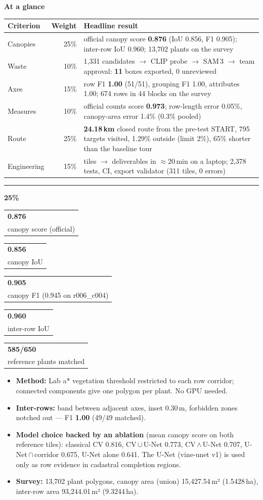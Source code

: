 \documentclass[10pt,a4paper]{article}
\makeatletter
\newcommand{\crit}[3]{%
  \par\vspace{7pt}%
  {\color{#1}\rule[-2pt]{6pt}{12pt}}\hspace{5pt}{\large\bfseries\color{night}#2}\hfill{\bfseries\color{#1}#3}\par
  \vspace{-2pt}{\color{#1}\rule{\linewidth}{0.8pt}}\par\vspace{2pt}}
\newcommand{\kpi}[2]{\begin{tabular}[t]{@{}l@{}}{\Large\bfseries\color{night}#1}\\[-1pt]{\scriptsize\color{muted}#2}\end{tabular}}
\makeatother
\begin{document}
\vspace{4pt}
{\large\bfseries At a glance}\par\vspace{2pt}
{\small
\begin{tabularx}{\linewidth}{@{}l r Y@{}}
  \toprule
  \textbf{Criterion} & \textbf{Weight} & \textbf{Headline result} \\
  \midrule
  Canopies    & 25\% & official canopy score \textbf{0.876} (IoU 0.856, F1 0.905); inter-row IoU 0.960; 13,702 plants on the survey \\
  Waste       & 10\% & 1,331 candidates $\rightarrow$ CLIP probe $\rightarrow$ SAM\,3 $\rightarrow$ team approval: \textbf{11} boxes exported, 0 unreviewed \\
  Axes        & 15\% & row F1 \textbf{1.00} (51/51), grouping F1 1.00, attributes 1.00; 674 rows in 44 blocks on the survey \\
  Measures    & 10\% & official counts score \textbf{0.973}; row-length error 0.05\%, canopy-area error 1.4\% (0.3\% pooled) \\
  Route       & 25\% & \textbf{24.18\,km} closed route from the pre-test START, 795 targets visited, 1.29\% outside (limit 2\%), 65\% shorter than the baseline tour \\
  Engineering & 15\% & tiles $\rightarrow$ deliverables in $\approx$20\,min on a laptop; 2,378 tests, CI, export validator (311 tiles, 0 errors) \\
  \bottomrule
\end{tabularx}}

\crit{cCan}{Canopies}{25\%}
\kpi{0.876}{canopy score (official)}\hfill
\kpi{0.856}{canopy IoU}\hfill
\kpi{0.905}{canopy F1 (0.945 on r006\_c004)}\hfill
\kpi{0.960}{inter-row IoU}\hfill
\kpi{585/650}{reference plants matched}
\par\vspace{3pt}
{\small
\begin{itemize}
  \item \textbf{Method:} Lab a* vegetation threshold restricted to each row corridor; connected components give one polygon per plant. No GPU needed.
  \item \textbf{Inter-rows:} band between adjacent axes, inset 0.30\,m, forbidden zones notched out — F1 \textbf{1.00} (49/49 matched).
  \item \textbf{Model choice backed by an ablation} (mean canopy score on both reference tiles): classical CV 0.816, CV\,$\cup$\,U-Net 0.773, CV\,$\wedge$\,U-Net 0.707, U-Net\,$\cap$\,corridor 0.675, U-Net alone 0.641. The U-Net (vine-unet v1) is used only as row evidence in cadastral completion regions.
  \item \textbf{Survey:} 13,702 plant polygons, canopy area (union) 15,427.54\,m² (1.5428\,ha), inter-row area 93,244.01\,m² (9.3244\,ha).
\end{itemize}}
\end{document}
